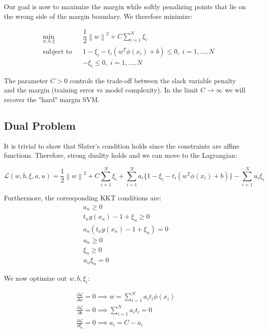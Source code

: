 \documentclass[twoside]{article}
\newcommand{\norm}[1]{\left\lVert #1 \right\rVert}
\begin{document}
Our goal is now to maximize the margin while softly penalizing points that lie on the wrong side of the margin boundary. We therefore minimize:

\begin{equation*}
\begin{aligned}
& \underset{w,b,\xi}{\text{min}}
& & \dfrac{1}{2} \norm{w}^2 + C \sum_{i=1}^{N} \xi_{i}\\
& \text{subject to}
& & 1 - \xi_{i} - t_{i} (w^T \phi(x_{i}) +b)  \leq 0, \; i = 1, \ldots, N \\
&&& - \xi_{i} \leq 0, \; i = 1, \ldots, N
\end{aligned}
\end{equation*}

The parameter $C > 0$ controls the trade-off between the slack variable penalty and the margin (training error vs model complexity). In the limit $C \xrightarrow{} \infty $ we will recover the "hard" margin SVM. 

\subsection{Dual Problem}
It is trivial to show that Slater's condition holds since the constraints are affine functions. Therefore, strong duality holds and we can move to the Lagrangian:

\begin{equation*}
    \mathcal{L}(w,b,\xi,a,u) = 
    \dfrac{1}{2} \norm{w}^2 + C \sum_{i=1}^{N} \xi_{i} + \sum_{i=1}^{N} a_{i} \{ 1 - \xi_{i} - t_{i} (w^T \phi(x_{i}) +b) \}
    - \sum_{i=1}^{N} u_{i}\xi_{i}
    \end{equation*}

Furthermore, the corresponding KKT conditions are:
\begin{align}
        a_{n} \geq 0 \\       
        t_{n}y(x_{n}) -1 +\xi_{n} \geq 0 \\
        a_{n}(t_{n}y(x_{n}) -1 +\xi_{n} ) = 0
        \\
        u_{n} \geq 0 \\
        \xi_{n} \geq 0 \\
        u_{n}\xi_{n} = 0
\end{align}


We now optimize out $w,b,\xi_{i}$:

\begin{align*}
        \frac{\partial{\mathcal{L}}}{\partial{w}} = 0 \implies w = \sum_{i=1}^{N} a_{i}t_{i}\phi(x_{i}) \\       \frac{\partial{\mathcal{L}}}{\partial{b}} = 0 \implies \sum_{i=1}^{N} a_{i}t_{i} = 0 \\
        \frac{\partial{\mathcal{L}}}{\partial{\xi_{i}}} = 0 \implies 
        a_{i} = C - u_{i}
\end{align*}
\end{document}
